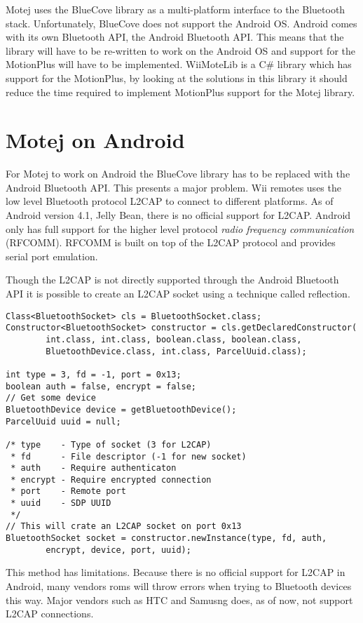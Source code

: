 Motej uses the BlueCove library as a multi-platform interface to the Bluetooth stack. Unfortunately, BlueCove does not support the Android OS. Android comes with its own Bluetooth API, the Android Bluetooth API. This means that the library will have to be re-written to work on the Android OS and support for the MotionPlus will have to be implemented. WiiMoteLib\cite{wiiMoteLib} is a C\# library which has support for the MotionPlus, by looking at the solutions in this library it should reduce the time required to implement MotionPlus support for the Motej library.

\section{Motej on Android}
For Motej to work on Android the BlueCove library has to be replaced with the Android Bluetooth API. This presents a major problem. Wii  remotes uses the low level Bluetooth protocol L2CAP to connect to different platforms. As of Android version 4.1, Jelly Bean, \cite{jellyBean} there is no official support for L2CAP. Android only has full support for the higher level protocol \emph{radio frequency communication} (RFCOMM). RFCOMM is built on top of the L2CAP protocol and provides serial port emulation. 

Though the L2CAP is not directly supported through the Android Bluetooth API it is possible to create an L2CAP socket using a technique called reflection.

\begin{lstlisting}
Class<BluetoothSocket> cls = BluetoothSocket.class;
Constructor<BluetoothSocket> constructor = cls.getDeclaredConstructor(
		int.class, int.class, boolean.class, boolean.class,
		BluetoothDevice.class, int.class, ParcelUuid.class);

int type = 3, fd = -1, port = 0x13;
boolean auth = false, encrypt = false;
// Get some device
BluetoothDevice device = getBluetoothDevice();
ParcelUuid uuid = null;

/* type    - Type of socket (3 for L2CAP)
 * fd      - File descriptor (-1 for new socket)
 * auth    - Require authenticaton
 * encrypt - Require encrypted connection
 * port    - Remote port
 * uuid	   - SDP UUID
 */
// This will crate an L2CAP socket on port 0x13
BluetoothSocket socket = constructor.newInstance(type, fd, auth,
		encrypt, device, port, uuid);
\end{lstlisting}

This method has limitations. Because there is no official support for L2CAP in Android, many vendors roms will throw errors when trying to Bluetooth devices this way. Major vendors such as HTC and Samusng does, as of now, not support L2CAP connections.

